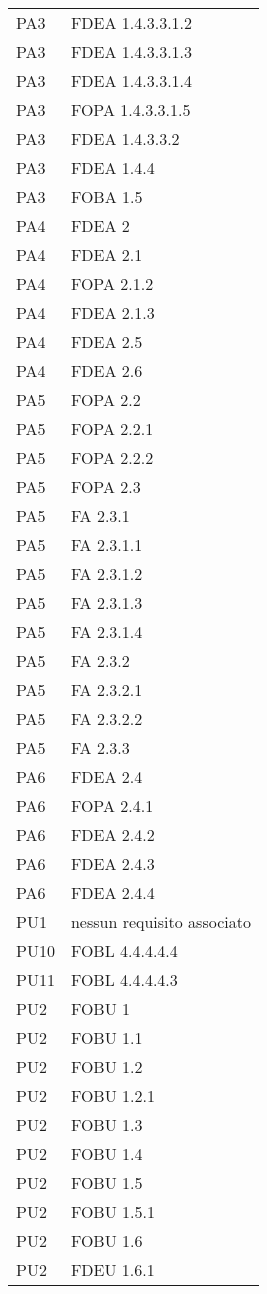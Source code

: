 \begin{longtable}{XX}
PA3&FDEA 1.4.3.3.1.2\\ 
PA3&FDEA 1.4.3.3.1.3\\ 
PA3&FDEA 1.4.3.3.1.4\\ 
PA3&FOPA 1.4.3.3.1.5\\ 
PA3&FDEA 1.4.3.3.2\\ 
PA3&FDEA 1.4.4\\ 
PA3&FOBA 1.5\\ 
\midrule 
PA4&FDEA 2\\ 
PA4&FDEA 2.1\\ 
PA4&FOPA 2.1.2\\ 
PA4&FDEA 2.1.3\\ 
PA4&FDEA 2.5\\ 
PA4&FDEA 2.6\\ 
\midrule 
PA5&FOPA 2.2\\ 
PA5&FOPA 2.2.1\\ 
PA5&FOPA 2.2.2\\ 
PA5&FOPA 2.3\\ 
PA5&FA 2.3.1\\ 
PA5&FA 2.3.1.1\\ 
PA5&FA 2.3.1.2\\ 
PA5&FA 2.3.1.3\\ 
PA5&FA 2.3.1.4\\ 
PA5&FA 2.3.2\\ 
PA5&FA 2.3.2.1\\ 
PA5&FA 2.3.2.2\\ 
PA5&FA 2.3.3\\ 
\midrule 
PA6&FDEA 2.4\\ 
PA6&FOPA 2.4.1\\ 
PA6&FDEA 2.4.2\\ 
PA6&FDEA 2.4.3\\ 
PA6&FDEA 2.4.4\\ 
\midrule 
PU1&nessun requisito associato\\ 
\midrule 
PU10&FOBL 4.4.4.4.4\\ 
\midrule 
PU11&FOBL 4.4.4.4.3\\ 
\midrule 
PU2&FOBU 1\\ 
PU2&FOBU 1.1\\ 
PU2&FOBU 1.2\\ 
PU2&FOBU 1.2.1\\ 
PU2&FOBU 1.3\\ 
PU2&FOBU 1.4\\ 
PU2&FOBU 1.5\\ 
PU2&FOBU 1.5.1\\ 
PU2&FOBU 1.6\\ 
PU2&FDEU 1.6.1\\ 

\end{longtable}
